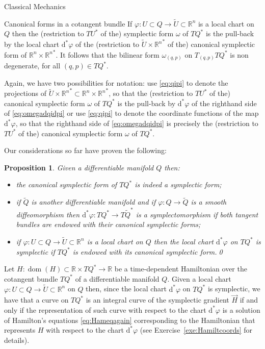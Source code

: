 \documentclass[oneside,a4paper,11pt]{amsbook}
\newcommand{\R}{\mathds R}
\newcommand{\dd}{\mathrm d}
\DeclareMathOperator{\Dom}{dom}
\theoremstyle{remark}\newtheorem{exercise}{Exercise}[chapter]
\theoremstyle{plain}\newtheorem{teo}{Theorem}[section]
\theoremstyle{plain}\newtheorem{lem}[teo]{Lemma}
\theoremstyle{plain}\newtheorem{prop}[teo]{Proposition}
\theoremstyle{plain}\newtheorem{cor}[teo]{Corollary}
\theoremstyle{definition}\newtheorem{defin}[teo]{Definition}
\theoremstyle{remark}\newtheorem{rem}[teo]{Remark}
\theoremstyle{definition}\newtheorem{notation}[teo]{Notation}
\theoremstyle{definition}\newtheorem{convention}[teo]{Convention}
\theoremstyle{definition}\newtheorem{example}[teo]{Example}
\numberwithin{section}{chapter}
\numberwithin{equation}{section}
\begin{document}
\begin{chapter}{Classical Mechanics}
\begin{section}{Canonical forms in a cotangent bundle}
If $\varphi:U\subset Q\to\widetilde U\subset\R^n$ is a local chart on $Q$ then the (restriction to $TU^*$ of the) symplectic form
$\omega$ of $TQ^*$ is the pull-back by the local chart $\dd^*\varphi$ of the (restriction to $\widetilde U\times{\R^n}^*$ of the)
canonical symplectic form of $\R^n\times{\R^n}^*$. It follows that the bilinear form $\omega_{(q,p)}$ on $T_{(q,p)}TQ^*$ is non degenerate,
for all $(q,p)\in TQ^*$.

Again, we have two possibilities for notation: use \eqref{eq:qipi} to denote the projections of $\widetilde U\times{\R^n}^*\subset\R^n\times{\R^n}^*$,
so that the (restriction to $TU^*$ of the) canonical symplectic form $\omega$ of $TQ^*$ is the pull-back by $\dd^*\varphi$ of the righthand
side of \eqref{eq:omegadqidpi} or use \eqref{eq:qipi} to denote the coordinate functions of the map $\dd^*\varphi$, so that
the righthand side of \eqref{eq:omegadqidpi} is precisely the (restriction to $TU^*$ of the) canonical symplectic form $\omega$ of $TQ^*$.

\medskip

Our considerations so far have proven the following:
\begin{prop}
Given a differentiable manifold $Q$ then:
\begin{itemize}
\item[(a)] the canonical symplectic form of $TQ^*$ is indeed a symplectic form;
\item[(b)] if $\widetilde Q$ is another differentiable manifold and if $\varphi:Q\to\widetilde Q$ is a smooth diffeomorphism then
$\dd^*\varphi:TQ^*\to T\widetilde Q^*$ is a symplectomorphism if both tangent bundles are endowed with their canonical symplectic forms;
\item[(c)] if $\varphi:U\subset Q\to\widetilde U\subset\R^n$ is a local chart on $Q$ then the local chart $\dd^*\varphi$ on $TQ^*$ is symplectic
if $TQ^*$ is endowed with its canonical symplectic form.\qed
\end{itemize}
\end{prop}

Let $H:\Dom(H)\subset\R\times TQ^*\to\R$ be a time-dependent Hamiltonian over the cotangent bundle $TQ^*$ of a differentiable manifold $Q$.
Given a local chart $\varphi:U\subset Q\to\widetilde U\subset\R^n$ on $Q$ then, since the local chart $\dd^*\varphi$ on $TQ^*$ is symplectic,
we have that a curve on $TQ^*$ is an integral curve of the symplectic gradient $\vec H$ if and only if the representation of such curve with
respect to the chart $\dd^*\varphi$ is a solution of Hamilton's equations \eqref{eq:Hameqagain} corresponding
to the Hamiltonian that represents $H$ with respect to the chart $\dd^*\varphi$ (see Exercise~\ref{exe:Hamiltcoords} for details).


\end{section}
\end{chapter}
\end{document}

